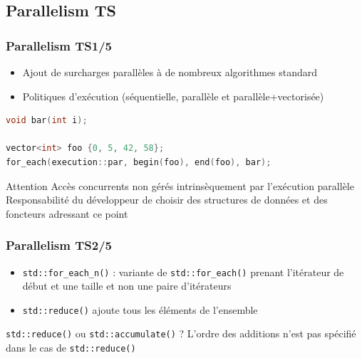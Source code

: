 \documentclass[C++.tex]{subfiles}
\begin{document}
\subsection*{Parallelism TS}
\begin{frame}[fragile]
	\frametitle{Parallelism TS\titlehfill{}1/5}
	\begin{itemize}
		\item Ajout de surcharges \og parallèles\fg{} à de nombreux algorithmes standard
		\item Politiques d'exécution (séquentielle, parallèle et parallèle+vectorisée)
	\end{itemize}

	\begin{lstlisting}[language=C++]
void bar(int i);

vector<int> foo {0, 5, 42, 58};
for_each(execution::par, begin(foo), end(foo), bar);\end{lstlisting}

	\begin{alertblock}{Attention}
		Accès concurrents non gérés intrinsèquement par l'exécution parallèle\\
		Responsabilité du développeur de choisir des structures de données et des foncteurs adressant ce point
	\end{alertblock}
\end{frame}

\begin{frame}[fragile]
	\frametitle{Parallelism TS\titlehfill{}2/5}
	\begin{itemize}
		\item \lstinline|std::for_each_n()| : variante de \lstinline|std::for_each()| prenant l'itérateur de début et une taille et non une paire d'itérateurs


		\item \lstinline|std::reduce()| \og ajoute\fg{} tous les éléments de l'ensemble
	\end{itemize}

	\begin{block}{\lstinline|std::reduce()| ou \lstinline|std::accumulate()| ?}
		L'ordre des \og additions\fg{} n'est pas spécifié dans le cas de \lstinline|std::reduce()|

	\end{block}
\end{frame}
\end{document}
